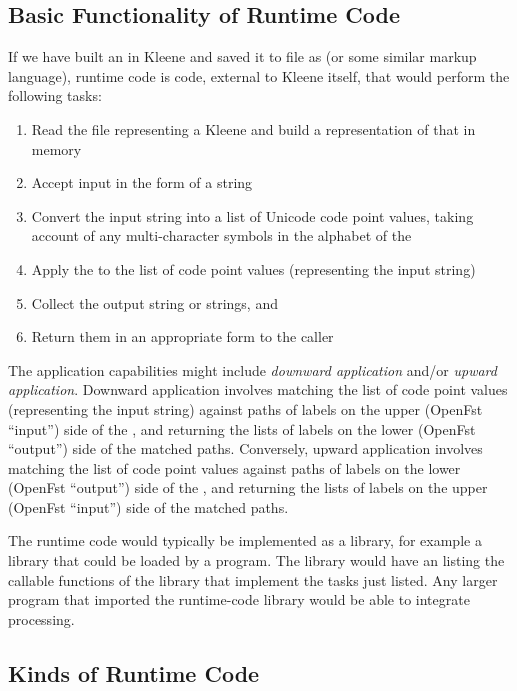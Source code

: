 \subsection{Basic Functionality of Runtime Code}

If we have built an \fsm{} in Kleene and saved it to file as  (or some similar markup
language), runtime code is
code, external to Kleene itself, that would perform the following tasks:

\begin{enumerate}
\item
Read the  file representing a Kleene \fsm{} and build a
representation of that \fsm{} in memory
\item
Accept input in the form of a string
\item
Convert the input string into a list of Unicode code point values, taking account of
any multi-character symbols in the alphabet of the \fsm{}
\item
Apply the \fsm{} to the list of code point values (representing the input string)
\item
Collect the output string or strings, and
\item
Return them in an appropriate form to the caller
\end{enumerate}

\noindent
The application capabilities might include \emph{downward application} and/or \emph{upward
application}.  Downward application involves matching the list
of code point values (representing the input string) against paths of labels on the upper (OpenFst ``input'') side of the
\fsm{}, and returning the lists of labels on the lower (OpenFst ``output'') side of the
matched paths.  Conversely, upward application involves matching the list of code point
values against paths of labels on the lower (OpenFst ``output'') side of the \fsm{}, and
returning the lists of labels on the upper (OpenFst ``input'') side of the matched paths.

The runtime code would typically be implemented as a library, for
example a \CPP{} library that
could be loaded
by a \CPP{} program.  The library would have an  listing the callable functions of the library
that implement the tasks just listed.  Any larger program that imported the
runtime-code library would be able to integrate \fsm{} processing.

\subsection{Kinds of Runtime Code}


